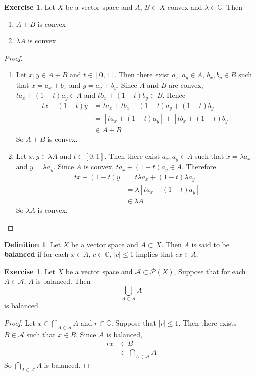 \documentclass[12pt]{amsart}
\theoremstyle{definition}
\newtheorem{defn}[definition]{Definition}
\newtheorem{ex}[definition]{Exercise}
\newcommand{\lam}{\lambda}
\newcommand{\C}{\mathbb{C}}
\newcommand{\MA}{\mathcal{A}}
\newcommand{\MP}{\mathcal{P}}
\newcommand{\tbf}[1]{\textbf{#1}}
\DeclareMathOperator*{\0}{\mbf{0}}
\DeclareMathOperator*{\1}{\mbf{1}}
\begin{document}
	\begin{ex}
		Let $X$ be a vector space and $A$, $B \subset X$ convex and $\lam \in \C$. Then 
		\begin{enumerate}
			\item $A + B$ is convex
			\item $\lam A$ is convex
		\end{enumerate}
	\end{ex}
	
	\begin{proof}\
		\begin{enumerate}
			\item Let $x,y \in A + B$ and $t \in [0,1]$. Then there exist $a_x, a_y \in A$, $b_x, b_y \in B$ such that $x = a_x + b_x$ and $y = a_y + b_y$. Since $A$ and $B$ are convex, $ta_x + (1-t)a_y \in A$ and $tb_x + (1-t)b_y \in B$. Hence 
			\begin{align*}
				tx + (1-t)y
				&= ta_x + tb_x + (1-t)a_y + (1-t)b_y \\
				&= [ta_x + (1-t)a_y] + [tb_x + (1-t)b_y] \\
				& \in A + B
			\end{align*}
			So $A + B$ is convex.
			\item Let $x, y \in \lam A$ and $t \in [0,1]$. Then there exist $a_x, a_y \in A$ such that $x = \lam a_x$ and $y = \lam a_y$. Since $A$ is convex, $t a_x + (1-t) a_y \in A$. Therefore 
			\begin{align*}
				tx + (1-t)y 
				&= t \lam a_x + (1-t) \lam a_y \\
				&= \lam [t a_x + (1-t) a_y ] \\
				& \in \lam A
			\end{align*}
			So $\lam A$ is convex.
		\end{enumerate}
	\end{proof}

		\begin{defn}
		Let $X$ be a vector space and $A \subset X$. Then $A$ is said to be \tbf{balanced} if for each $x \in A$, $c \in \C$, $|c| \leq 1$ implies that $cx \in A$.
	\end{defn}

		\begin{ex}
		Let $X$ be a vector space and $\MA \subset \MP(X)$, Suppose that for each $A \in \MA$, $A$ is balanced. Then $$\bigcup_{A \in \MA} A$$ is balanced.
	\end{ex}
	
	\begin{proof}
		Let $x \in \bigcap\limits_{A \in \MA} A$ and $r \in \C$. Suppose that $|r| \leq 1$. Then there exists $B \in \MA$ such that $x \in B$. Since $A$ is balanced, 
		\begin{align*}
			rx 
			&\in B \\
			& \subset \bigcap\limits_{A \in \MA} A
		\end{align*}
		So $\bigcap\limits_{A \in \MA} A$ is balanced.
	\end{proof}
\end{document}
